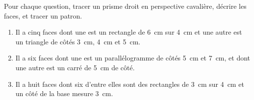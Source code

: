 
\begin{exercice}\label{exo2smath-0291}


 Pour chaque question, tracer un prisme droit en perspective cavalière, décrire les faces, et tracer un patron.
 \begin{enumerate}
     \item
         
         Il a cinq faces dont une est un rectangle de \SI{6}{\centi\meter} sur \SI{4}{\centi\meter} et une autre est un triangle de côtés \SI{3}{\centi\meter}, \SI{4}{\centi\meter} et \SI{5}{\centi\meter}.

\item
    Il a six faces dont une est un parallélogramme de côtés \SI{5}{\centi\meter} et \SI{7}{\centi\meter}, et dont une autre est un carré de \SI{5}{\centi\meter} de côté.
\item

    Il a huit faces dont six d'entre elles sont des rectangles de \SI{3}{\centi\meter} sur \SI{4}{\centi\meter} et un côté de la base mesure \SI{3}{\centi\meter}.
 \end{enumerate}

\end{exercice}
